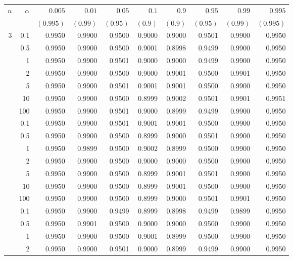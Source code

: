\documentclass[11pt]{article}
\theoremstyle{remark}
\begin{document}
\begin{table}[p]
\centering
\scriptsize
\setlength{\tabcolsep}{3.5pt}
\begin{tabular}{rrrrrrrrrr}
\toprule
$n$ & $\alpha$ & $0.005$ & $0.01$ & $0.05$ & $0.1$ & $0.9$ & $0.95$ & $0.99$ & $0.995$ \\
 & & $(0.995)$ & $(0.99)$ & $(0.95)$ & $(0.9)$ & $(0.9)$ & $(0.95)$ & $(0.99)$ & $(0.995)$ \\
\midrule
3 & 0.1 & 0.9950 & 0.9900 & 0.9500 & 0.9000 & 0.9000 & 0.9501 & 0.9900 & 0.9950 \\
 & 0.5 & 0.9950 & 0.9900 & 0.9500 & 0.9001 & 0.8998 & 0.9499 & 0.9900 & 0.9950 \\
 & 1 & 0.9950 & 0.9900 & 0.9501 & 0.9000 & 0.9000 & 0.9499 & 0.9900 & 0.9950 \\
 & 2 & 0.9950 & 0.9900 & 0.9500 & 0.9000 & 0.9001 & 0.9500 & 0.9901 & 0.9950 \\
 & 5 & 0.9950 & 0.9900 & 0.9501 & 0.9001 & 0.9001 & 0.9500 & 0.9900 & 0.9950 \\
 & 10 & 0.9950 & 0.9900 & 0.9500 & 0.8999 & 0.9002 & 0.9501 & 0.9901 & 0.9951 \\
 & 100 & 0.9950 & 0.9900 & 0.9501 & 0.9000 & 0.8999 & 0.9499 & 0.9900 & 0.9950 \\
\addlinespace
5 & 0.1 & 0.9950 & 0.9900 & 0.9501 & 0.9001 & 0.9001 & 0.9500 & 0.9900 & 0.9950 \\
 & 0.5 & 0.9950 & 0.9900 & 0.9500 & 0.8999 & 0.9000 & 0.9501 & 0.9900 & 0.9950 \\
 & 1 & 0.9950 & 0.9899 & 0.9500 & 0.9002 & 0.8999 & 0.9500 & 0.9900 & 0.9950 \\
 & 2 & 0.9950 & 0.9900 & 0.9500 & 0.9000 & 0.9000 & 0.9500 & 0.9900 & 0.9950 \\
 & 5 & 0.9950 & 0.9900 & 0.9500 & 0.8999 & 0.9001 & 0.9501 & 0.9900 & 0.9950 \\
 & 10 & 0.9950 & 0.9900 & 0.9500 & 0.8999 & 0.9001 & 0.9500 & 0.9900 & 0.9950 \\
 & 100 & 0.9950 & 0.9900 & 0.9500 & 0.8999 & 0.9000 & 0.9501 & 0.9901 & 0.9950 \\
\addlinespace
10 & 0.1 & 0.9950 & 0.9900 & 0.9499 & 0.8999 & 0.8998 & 0.9499 & 0.9899 & 0.9950 \\
 & 0.5 & 0.9950 & 0.9901 & 0.9500 & 0.9000 & 0.9000 & 0.9500 & 0.9900 & 0.9950 \\
 & 1 & 0.9950 & 0.9900 & 0.9500 & 0.9001 & 0.8999 & 0.9500 & 0.9900 & 0.9950 \\
 & 2 & 0.9950 & 0.9900 & 0.9501 & 0.9000 & 0.8999 & 0.9499 & 0.9900 & 0.9950 \\

\end{tabular}
\end{table}
\end{document}

